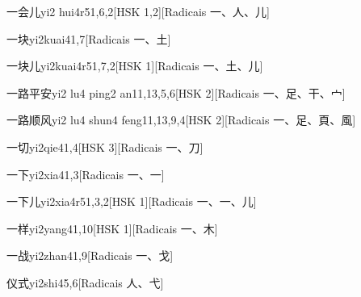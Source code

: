 \begin{entry}{一会儿}{yi2 hui4r5}{1,6,2}[HSK 1,2][Radicais ⼀、⼈、⼉]
\end{entry}

\begin{entry}{一块}{yi2kuai4}{1,7}[Radicais ⼀、⼟]
\end{entry}

\begin{entry}{一块儿}{yi2kuai4r5}{1,7,2}[HSK 1][Radicais ⼀、⼟、⼉]
\end{entry}

\begin{entry}{一路平安}{yi2 lu4 ping2 an1}{1,13,5,6}[HSK 2][Radicais ⼀、⾜、⼲、⼧]
\end{entry}

\begin{entry}{一路顺风}{yi2 lu4 shun4 feng1}{1,13,9,4}[HSK 2][Radicais ⼀、⾜、⾴、⾵]
\end{entry}

\begin{entry}{一切}{yi2qie4}{1,4}[HSK 3][Radicais ⼀、⼑]
\end{entry}

\begin{entry}{一下}{yi2xia4}{1,3}[Radicais ⼀、⼀]
\end{entry}

\begin{entry}{一下儿}{yi2xia4r5}{1,3,2}[HSK 1][Radicais ⼀、⼀、⼉]
\end{entry}

\begin{entry}{一样}{yi2yang4}{1,10}[HSK 1][Radicais ⼀、⽊]
\end{entry}

\begin{entry}{一战}{yi2zhan4}{1,9}[Radicais ⼀、⼽]
\end{entry}

\begin{entry}{仪式}{yi2shi4}{5,6}[Radicais ⼈、⼷]
\end{entry}

